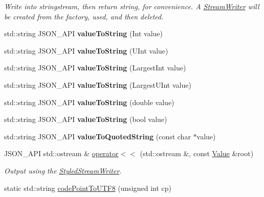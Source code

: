 \begin{DoxyCompactItemize}
\begin{DoxyCompactList}\small\item\em Write into stringstream, then return string, for convenience. A \hyperlink{class_json_1_1_stream_writer}{Stream\+Writer} will be created from the factory, used, and then deleted. \end{DoxyCompactList}\item 
\hypertarget{namespace_json_a5d3eba6789f9a9c1ab563ff8b4a5090f}{}std\+::string J\+S\+O\+N\+\_\+\+A\+P\+I {\bfseries value\+To\+String} (Int value)\label{namespace_json_a5d3eba6789f9a9c1ab563ff8b4a5090f}

\item 
\hypertarget{namespace_json_a4d43b0ff222bd3975bcf1babca0b978f}{}std\+::string J\+S\+O\+N\+\_\+\+A\+P\+I {\bfseries value\+To\+String} (U\+Int value)\label{namespace_json_a4d43b0ff222bd3975bcf1babca0b978f}

\item 
\hypertarget{namespace_json_abd9c650f70d9434f98f9025e2e2faf2d}{}std\+::string J\+S\+O\+N\+\_\+\+A\+P\+I {\bfseries value\+To\+String} (Largest\+Int value)\label{namespace_json_abd9c650f70d9434f98f9025e2e2faf2d}

\item 
\hypertarget{namespace_json_a3f46b0bc62b95a9426a2da0117bdf9f0}{}std\+::string J\+S\+O\+N\+\_\+\+A\+P\+I {\bfseries value\+To\+String} (Largest\+U\+Int value)\label{namespace_json_a3f46b0bc62b95a9426a2da0117bdf9f0}

\item 
\hypertarget{namespace_json_a99995d7dafa4f4970b349d7d3c8d1d99}{}std\+::string J\+S\+O\+N\+\_\+\+A\+P\+I {\bfseries value\+To\+String} (double value)\label{namespace_json_a99995d7dafa4f4970b349d7d3c8d1d99}

\item 
\hypertarget{namespace_json_a979ed531f091985e22f0051cd2a8e341}{}std\+::string J\+S\+O\+N\+\_\+\+A\+P\+I {\bfseries value\+To\+String} (bool value)\label{namespace_json_a979ed531f091985e22f0051cd2a8e341}

\item 
\hypertarget{namespace_json_aa0c8235a4a5c6599da5d3332743db8ac}{}std\+::string J\+S\+O\+N\+\_\+\+A\+P\+I {\bfseries value\+To\+Quoted\+String} (const char $\ast$value)\label{namespace_json_aa0c8235a4a5c6599da5d3332743db8ac}

\item 
J\+S\+O\+N\+\_\+\+A\+P\+I std\+::ostream \& \hyperlink{namespace_json_a0ef6e98bafd4dba52f6ef28ed33913f4}{operator$<$$<$} (std\+::ostream \&, const \hyperlink{class_json_1_1_value}{Value} \&root)
\begin{DoxyCompactList}\small\item\em Output using the \hyperlink{class_json_1_1_styled_stream_writer}{Styled\+Stream\+Writer}. \end{DoxyCompactList}\item 
\hypertarget{namespace_json_adf0456e397a18cd7218a7b51dfc13c73}{}static std\+::string \hyperlink{namespace_json_adf0456e397a18cd7218a7b51dfc13c73}{code\+Point\+To\+U\+T\+F8} (unsigned int cp)\label{namespace_json_adf0456e397a18cd7218a7b51dfc13c73}


\end{DoxyCompactItemize}
